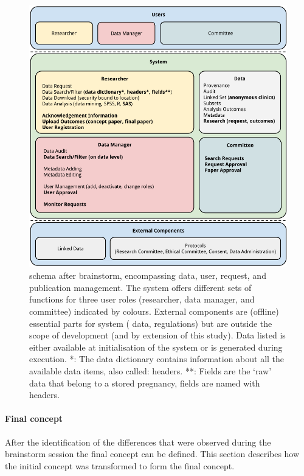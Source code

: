 \begin{figure}[t]
	\centering
	\includegraphics[width=1.0\linewidth]{images/brainstorm-after}
	\caption{
		\ivfsystem{} schema after brainstorm, encompassing data, user, request, and publication management.
		The system offers different sets of functions for three user roles (researcher, data manager, and committee) indicated by colours. 
		External components are (offline) essential parts for system (\eg{} data, regulations) but are outside the scope of development (and by extension of this study).
		Data listed is either available at initialisation of the system or is generated during execution.
		*: The data dictionary contains information about all the available data items, also called: headers.
		**: Fields are the `raw' data that belong to a stored pregnancy, fields are named with headers.
	}
	\label{fig:brainstorm-after}
\end{figure}

\paragraph{Final concept}

After the identification of the differences that were observed during the brainstorm session the final concept can be defined.
This section describes how the initial concept was transformed to form the final concept.

